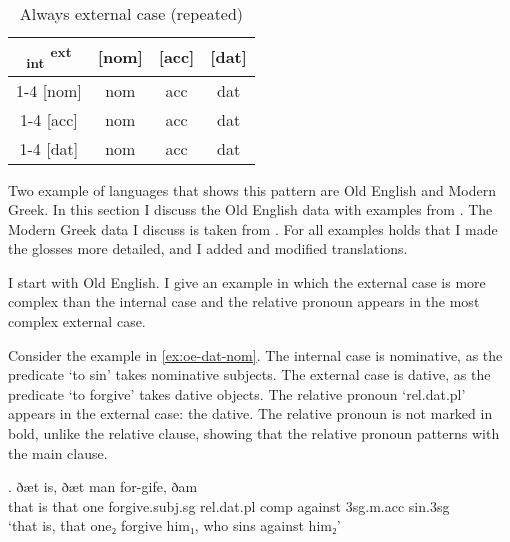 \begin{table}[ht]
  \center
  \caption{Always external case (repeated)}
  \begin{tabular}{c|c|c|c}
    \toprule
   \textsubscript{\ac{int}} \textsuperscript{\ac{ext}}
          & [\ac{nom}]
          & [\ac{acc}]
          & [\ac{dat}]
          \\ \cmidrule{1-4}
      [\ac{nom}]
          & \ac{nom}
          & \ac{acc}
          & \ac{dat}
          \\ \cmidrule{1-4}
      [\ac{acc}]
          & \ac{nom}
          & \ac{acc}
          & \ac{dat}
          \\ \cmidrule{1-4}
      [\ac{dat}]
          & \ac{nom}
          & \ac{acc}
          & \ac{dat}
          \\
    \bottomrule
  \end{tabular}
  \label{tbl:no-case-competition-ext-repeated}
\end{table}

Two example of languages that shows this pattern are Old English and Modern Greek. In this section I discuss the Old English data with examples from \citet{harbert1983}. The Modern Greek data I discuss is taken from \citet{daskalaki2011}. For all examples holds that I made the glosses more detailed, and I added and modified translations.

I start with Old English. I give an example in which the external case is more complex than the internal case and the relative pronoun appears in the most complex external case.

Consider the example in \ref{ex:oe-dat-nom}.
The internal case is nominative, as the predicate  `to sin' takes nominative subjects.
The external case is dative, as the predicate  `to forgive' takes dative objects.
The relative pronoun  `\ac{rel}.\ac{dat}.\ac{pl}' appears in the external case: the dative. The relative pronoun is not marked in bold, unlike the relative clause, showing that the relative pronoun patterns with the main clause.

\exg. ðæt is, ðæt man for-gife, ðam    \\
 that is that one forgive.\ac{subj}.\ac{sg}\scsub{[dat]} \ac{rel}.\ac{dat}.\ac{pl} \ac{comp} against 3\ac{sg}.\ac{m}.\ac{acc} sin.3\ac{sg}\scsub{[nom]}\\
 `that is, that one₂ forgive him₁, who sins against him₂'  \label{ex:oe-dat-nom}

